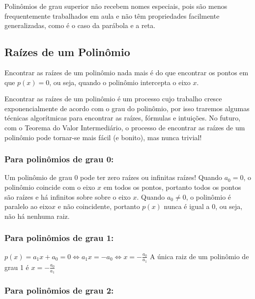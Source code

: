 \documentclass[
  letterpaper,
  DIV=11,
  numbers=noendperiod]{scrreprt}
\begin{document}
Polinômios de grau superior não recebem nomes especiais, pois são menos
frequentemente trabalhados em aula e não têm propriedades facilmente
generalizadas, como é o caso da parábola e a reta.

\subsection{Raízes de um Polinômio}\label{rauxedzes-de-um-polinuxf4mio}

Encontrar as raízes de um polinômio nada mais é do que encontrar os
pontos em que \(p(x) = 0\), ou seja, quando o polinômio intercepta o
eixo \(x\).

Encontrar as raízes de um polinômio é um processo cujo trabalho cresce
exponencialmente de acordo com o grau do polinômio, por isso traremos
algumas técnicas algorítmicas para encontrar as raízes, fórmulas e
intuições. No futuro, com o Teorema do Valor Intermediário, o processo
de encontrar as raízes de um polinômio pode tornar-se mais fácil (e
bonito), mas nunca trivial!

\subsubsection{Para polinômios de grau
0:}\label{para-polinuxf4mios-de-grau-0}

Um polinômio de grau 0 pode ter zero raízes ou infinitas raízes! Quando
\(a_0=0\), o polinômio coincide com o eixo \(x\) em todos os pontos,
portanto todos os pontos são raízes e há infinitos sobre sobre o eixo
\(x\). Quando \(a_0 \neq 0\), o polinômio é paralelo ao eixo\(x\) e não
coincidente, portanto \(p(x)\) nunca é igual a \(0\), ou seja, não há
nenhuma raiz.

\subsubsection{Para polinômios de grau
1:}\label{para-polinuxf4mios-de-grau-1}

\(p(x) = a_1x+a_0 =0 \Leftrightarrow a_1x=-a_0 \Leftrightarrow x = -\frac{a_0}{a_1}\)
A única raiz de um polinômio de grau 1 é \(x=-\frac{a_0}{a_1}\)

\subsubsection{Para polinômios de grau
2:}\label{para-polinuxf4mios-de-grau-2}
\end{document}
